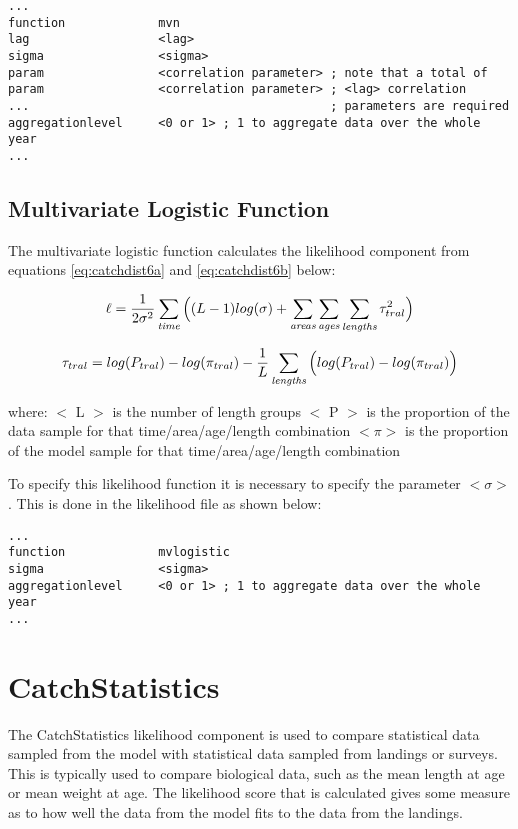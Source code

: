 \documentclass[10pt,twoside]{book}
\begin{document}
{\small\begin{verbatim}
...
function             mvn
lag                  <lag>
sigma                <sigma>
param                <correlation parameter> ; note that a total of
param                <correlation parameter> ; <lag> correlation
...                                          ; parameters are required
aggregationlevel     <0 or 1> ; 1 to aggregate data over the whole year
...
\end{verbatim}}

\subsection{Multivariate Logistic Function}
The multivariate logistic function calculates the likelihood component from equations \ref{eq:catchdist6a} and \ref{eq:catchdist6b} below:

\begin{equation}\label{eq:catchdist6a}
\ell = \frac{1}{2\sigma^2} \sum_{\it time} \Big((L - 1) log(\sigma)+\sum_{\it areas}\sum_{\it ages}\sum_{\it lengths} \tau_{tral}^2 \Big)
\end{equation}

\begin{equation}\label{eq:catchdist6b}
\tau_{tral} = log(P_{tral}) - log(\pi_{tral}) - \frac{1}{L}\sum_{\it lengths} \Big(log(P_{tral}) - log(\pi_{tral}) \Big)
\end{equation}

where:\newline
$<$ L $>$ is the number of length groups\newline
$<$ P $>$ is the proportion of the data sample for that time/area/age/length combination\newline
$<\pi>$ is the proportion of the model sample for that time/area/age/length combination

\bigskip
To specify this likelihood function it is necessary to specify the parameter $<\sigma>$. This is done in the likelihood file as shown below:

{\small\begin{verbatim}
...
function             mvlogistic
sigma                <sigma>
aggregationlevel     <0 or 1> ; 1 to aggregate data over the whole year
...
\end{verbatim}}

\section{CatchStatistics}\label{sec:catchstat}
The CatchStatistics likelihood component is used to compare statistical data sampled from the model with statistical data sampled from landings or surveys.  This is typically used to compare biological data, such as the mean length at age or mean weight at age.  The likelihood score that is calculated gives some measure as to how well the data from the model fits to the data from the landings.
\end{document}
